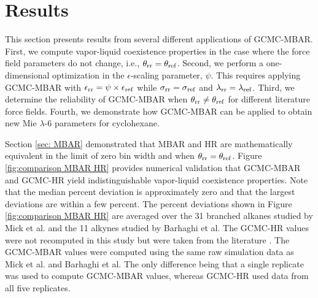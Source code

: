 \documentclass[journal=jced,manuscript=article]{achemso}
\begin{document}


\section{Results} \label{sec: Results}

This section presents results from several different applications of GCMC-MBAR. First, we compute vapor-liquid coexistence properties in the case where the force field parameters do not change, i.e., $\theta_{\rm rr} = \theta_{\rm ref}$. Second, we perform a one-dimensional optimization in the $\epsilon$-scaling parameter, $\psi$. This requires applying GCMC-MBAR with $\epsilon_{\rm rr} = \psi \times \epsilon_{\rm ref}$ while $\sigma_{\rm rr} = \sigma_{\rm ref}$ and $\lambda_{\rm rr} = \lambda_{\rm ref}$. Third, we determine the reliability of GCMC-MBAR when $\theta_{\rm rr} \neq \theta_{\rm ref}$ for different literature force fields. Fourth, we demonstrate how GCMC-MBAR can be applied to obtain new Mie $\lambda$-6 parameters for cyclohexane.

Section \ref{sec: MBAR} demonstrated that MBAR and HR are mathematically equivalent in the limit of zero bin width and when $\theta_{\rm rr} = \theta_{\rm ref}$. Figure \ref{fig:comparison MBAR HR} provides numerical validation that GCMC-MBAR and GCMC-HR yield indistinguishable vapor-liquid coexistence properties. Note that the median percent deviation is approximately zero and that the largest deviations are within a few percent. The percent deviations shown in Figure \ref{fig:comparison MBAR HR} are averaged over the 31 branched alkanes studied by Mick et al. and the 11 alkynes studied by Barhaghi et al. The GCMC-HR values were not recomputed in this study but were taken from the literature \cite{Potoff_branched,Barhaghi2017}. The GCMC-MBAR values were computed using the same raw simulation data as Mick et al. and Barhaghi et al. The only difference being that a single replicate was used to compute GCMC-MBAR values, whereas GCMC-HR used data from all five replicates. 
\end{document}
